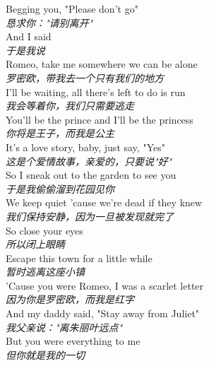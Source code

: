 \begin{spacing}{1.5}
\begin{flushleft}
Begging you, "Please don't go"\\
\textit{恳求你："请别离开"}\\[0.5em]

And I said\\
\textit{于是我说}\\[0.5em]

Romeo, take me somewhere we can be alone\\
\textit{罗密欧，带我去一个只有我们的地方}\\[0.5em]

I'll be waiting, all there's left to do is run\\
\textit{我会等着你，我们只需要逃走}\\[0.5em]

You'll be the prince and I'll be the princess\\
\textit{你将是王子，而我是公主}\\[0.5em]

It's a love story, baby, just say, "Yes"\\
\textit{这是个爱情故事，亲爱的，只要说"好"}\\[0.5em]

So I sneak out to the garden to see you\\
\textit{于是我偷偷溜到花园见你}\\[0.5em]

We keep quiet 'cause we're dead if they knew\\
\textit{我们保持安静，因为一旦被发现就完了}\\[0.5em]

So close your eyes\\
\textit{所以闭上眼睛}\\[0.5em]

Escape this town for a little while\\
\textit{暂时逃离这座小镇}\\[0.5em]

'Cause you were Romeo, I was a scarlet letter\\
\textit{因为你是罗密欧，而我是红字}\\[0.5em]

And my daddy said, "Stay away from Juliet"\\
\textit{我父亲说："离朱丽叶远点"}\\[0.5em]

But you were everything to me\\
\textit{但你就是我的一切}\\[0.5em]


\end{flushleft}
\end{spacing}
